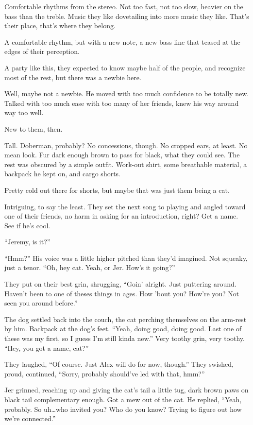 \documentclass[12pt,letterpaper,oneside]{memoir}
\begin{document}
  Comfortable rhythms from the stereo. Not too fast, not too slow, heavier
  on the bass than the treble. Music they like dovetailing into more music
  they like. That's their place, that's where they belong.

  A comfortable rhythm, but with a new note, a new bass-line that teased
  at the edges of their perception.

  A party like this, they expected to know maybe half of the people, and
  recognize most of the rest, but there was a newbie here.

  Well, maybe not a newbie. He moved with too much confidence to be
  totally new. Talked with too much ease with too many of her friends,
  knew his way around way too well.

  New to them, then.

  Tall. Doberman, probably? No concessions, though. No cropped ears, at
  least. No mean look. Fur dark enough brown to pass for black, what they
  could see. The rest was obscured by a simple outfit. Work-out shirt,
  some breathable material, a backpack he kept on, and cargo shorts.

  Pretty cold out there for shorts, but maybe that was just them being a
  cat.

  Intriguing, to say the least. They set the next song to playing and
  angled toward one of their friends, no harm in asking for an
  introduction, right? Get a name. See if he's cool.

  ``Jeremy, is it?''

  ``Hmm?'' His voice was a little higher pitched than they'd imagined. Not
  squeaky, just a tenor. ``Oh, hey cat. Yeah, or Jer. How's it going?''

  They put on their best grin, shrugging, ``Goin' alright. Just puttering
  around. Haven't been to one of theses things in ages. How 'bout you?
  How're you? Not seen you around before.''

  The dog settled back into the couch, the cat perching themselves on the
  arm-rest by him. Backpack at the dog's feet. ``Yeah, doing good, doing
  good. Last one of these was my first, so I guess I'm still kinda new.''
  Very toothy grin, very toothy. ``Hey, you got a name, cat?''

  They laughed, ``Of course. Just Alex will do for now, though.'' They
  swished, proud, continued, ``Sorry, probably should've led with that,
  hmm?''

  Jer grinned, reaching up and giving the cat's tail a little tug, dark
  brown paws on black tail complementary enough. Got a mew out of the cat.
  He replied, ``Yeah, probably. So uh\ldots{}who invited you? Who do you
  know? Trying to figure out how we're connected.''
\end{document}
